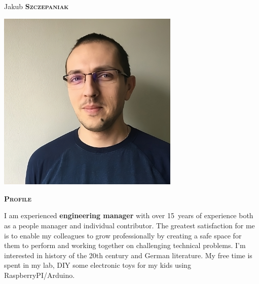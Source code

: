 \documentclass[11pt, a4paper]{article}
\newcommand{\headleft}[1]{\vspace*{3ex}\textsc{\textbf{#1}}\par%
    \vspace*{-1.5ex}\hrulefill\par\vspace*{0.7ex}}
\begin{document}
\setlength{\topskip}{0pt}
\setlength{\parindent}{0pt}
\setlength{\parskip}{0pt}
\setlength{\fboxsep}{0pt}
\pagestyle{empty}
\raggedbottom

\begin{minipage}[t]{0.33\textwidth} %
\colorbox{cvblue}{\begin{minipage}[t][5mm][t]{\textwidth}\null\hfill\null\end{minipage}}

\vspace{-.2ex} %
\colorbox{cvblue!90}{\color{white}  %
\textwidth\relax%
\begin{minipage}[t][293mm][t]{0.82\textwidth}
\raggedright
\vspace*{2.5ex}

\Large Jakub \textbf{\textsc{Szczepaniak}} \normalsize 

\null\hfill\includegraphics[width=0.65\textwidth]{photo.jpg}\hfill\null

\vspace*{0.5ex} %

\headleft{Profile}
I am experienced \textbf{engineering manager} with over 15~years of experience both as a people manager and individual contributor.
The greatest satisfaction for me is to enable my colleagues to grow professionally by creating a safe space for them to perform and working together on challenging technical problems.
I'm interested in history of the 20th century and German literature.
My free time is spent in my lab, DIY some electronic toys for my kids using RaspberryPI/Arduino.


\end{minipage}}
\end{minipage}
\end{document}

